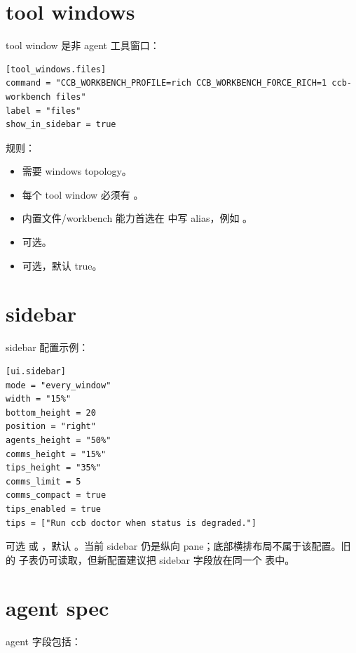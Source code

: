 \section{tool windows}

tool window 是非 agent 工具窗口：

\begin{lstlisting}
[tool_windows.files]
command = "CCB_WORKBENCH_PROFILE=rich CCB_WORKBENCH_FORCE_RICH=1 ccb-workbench files"
label = "files"
show_in_sidebar = true
\end{lstlisting}

规则：

\begin{itemize}
  \item {} 需要 windows topology。
  \item 每个 tool window 必须有 。
  \item 内置文件/workbench 能力首选在  中写  alias，例如 。
  \item {} 可选。
  \item {} 可选，默认 true。
\end{itemize}

\section{sidebar}

sidebar 配置示例：

\begin{lstlisting}
[ui.sidebar]
mode = "every_window"
width = "15%"
bottom_height = 20
position = "right"
agents_height = "50%"
comms_height = "15%"
tips_height = "35%"
comms_limit = 5
comms_compact = true
tips_enabled = true
tips = ["Run ccb doctor when status is degraded."]
\end{lstlisting}

 可选  或 ，默认 。当前 sidebar 仍是纵向 pane；底部横排布局不属于该配置。旧的  子表仍可读取，但新配置建议把 sidebar 字段放在同一个  表中。

\section{agent spec}

agent 字段包括：

